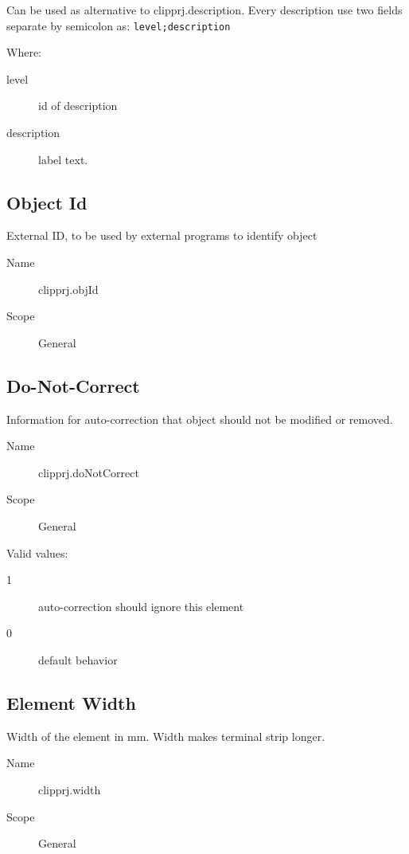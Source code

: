 \documentclass[%
	a4paper,
	oneside,
	listof=numbered,
	parskip=half,
	headsepline=true,
	footsepline=false,
	0.7headlines,
	]{scrbook}
\begin{document}
Can be used as alternative to clipprj.description.
Every description use two fields separate by semicolon as: \verb|level;description|

Where:

\begin{description}
	\item[level] id of description
	\item[description] label text.
\end{description}

\subsection{Object Id}

External ID, to be used by external programs to identify object

\begin{description}
	\item[Name] clipprj.objId
	\item[Scope] General
\end{description}

\subsection{Do-Not-Correct}

Information for auto-correction that object should not be modified or removed.

\begin{description}
	\item[Name] clipprj.doNotCorrect
	\item[Scope] General
\end{description}

Valid values:

\begin{description}
	\item[1] auto-correction should ignore this element
	\item[0] default behavior
\end{description}

\subsection{Element Width}

Width of the element in mm.
Width makes terminal strip longer.\\

\begin{description}
	\item[Name] clipprj.width
	\item[Scope] General
\end{description}
\end{document}
